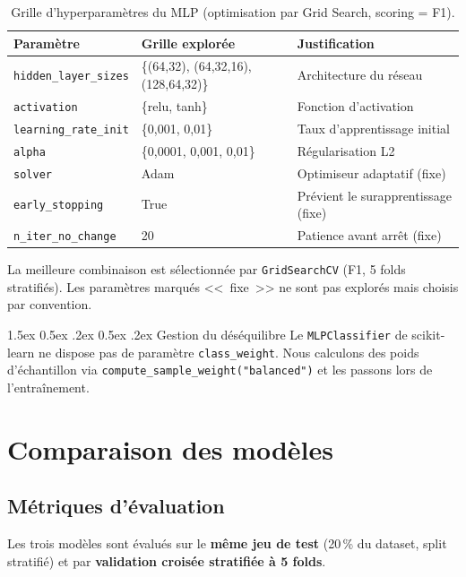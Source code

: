 \documentclass[12pt,a4paper]{article}
\makeatletter
\renewcommand\paragraph{\@startsection{paragraph}{4}{\z@}%
  {1.5ex \@plus 0.5ex \@minus .2ex}%
  {0.5ex \@plus .2ex}%
  {\normalfont\normalsize\bfseries}}
\makeatother
\begin{document}
\begin{table}[ht]
\centering
\begin{tabular}{lll}
\toprule
\textbf{Paramètre} & \textbf{Grille explorée} & \textbf{Justification} \\
\midrule
\texttt{hidden\_layer\_sizes} & \{(64,32), (64,32,16), (128,64,32)\} & Architecture du réseau \\
\texttt{activation} & \{relu, tanh\} & Fonction d'activation \\
\texttt{learning\_rate\_init} & \{0{,}001, 0{,}01\} & Taux d'apprentissage initial \\
\texttt{alpha} & \{0{,}0001, 0{,}001, 0{,}01\} & Régularisation L2 \\
\texttt{solver} & Adam & Optimiseur adaptatif (fixe) \\
\texttt{early\_stopping} & True & Prévient le surapprentissage (fixe) \\
\texttt{n\_iter\_no\_change} & 20 & Patience avant arrêt (fixe) \\
\bottomrule
\end{tabular}
\caption{Grille d'hyperparamètres du MLP (optimisation par Grid Search, scoring = F1).}
\end{table}

La meilleure combinaison est sélectionnée par \texttt{GridSearchCV} (F1, 5 folds stratifiés). Les paramètres marqués <<~fixe~>> ne sont pas explorés mais choisis par convention.

\paragraph{Gestion du déséquilibre} Le \texttt{MLPClassifier} de scikit-learn ne dispose pas de paramètre \texttt{class\_weight}. Nous calculons des poids d'échantillon via \texttt{compute\_sample\_weight("balanced")} et les passons lors de l'entraînement.

\section{Comparaison des modèles}

\subsection{Métriques d'évaluation}

Les trois modèles sont évalués sur le \textbf{même jeu de test} (20\,\% du dataset, split stratifié) et par \textbf{validation croisée stratifiée à 5 folds}.
\end{document}
